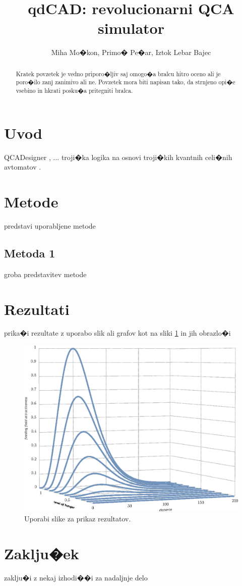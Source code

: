 \documentclass[seminar, slovene]{FRIreport}
\newcommand{\figref}[1]{\ref{#1}}
\begin{document}
\title{qdCAD: revolucionarni QCA simulator}

\author[M Mo�kon \etal]{Miha Mo�kon, Primo� Pe�ar, Iztok Lebar Bajec}

\address{Skupina 1}

\begin{abstract}
Kratek povzetek je vedno priporo�ljiv saj omogo�a bralcu hitro o\-ce\-no ali je poro�ilo zanj zanimivo ali ne. Povzetek mora biti napisan tako, da strnjeno opi�e vsebino in hkrati posku�a pritegniti bralca. 

\end{abstract}



%
\section{Uvod}
%
QCADesigner \cite{walus:2004}, ... troji�ka logika na osnovi troji�kih kvantnih celi�nih avtomatov \cite{lebar_bajec:2005c,lebar_bajec:2006a,lebar_bajec:2006b}.

%
\section{Metode}
%
predstavi uporabljene metode

%
\subsection{Metoda 1}
%
groba predstavitev metode
 
%
\section{Rezultati}
%
prika�i rezultate z uporabo slik ali grafov kot na sliki \figref{fig.Df} in jih obrazlo�i
%
\begin{figure}[htb]
\includegraphics{figDf.eps}
\caption{Uporabi slike za prikaz rezultatov.}
\label{fig.Df}
\end{figure}
%

%
\section{Zaklju�ek}
%
zaklju�i z nekaj izhodi��i za nadaljnje delo

%
\References
%

%

\end{document}
